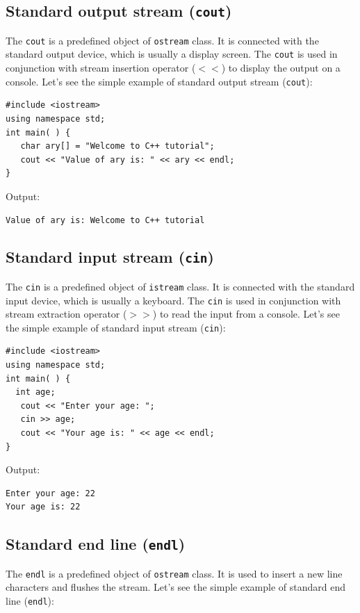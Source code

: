 \documentclass{book}
\begin{document}
\subsection{Standard output stream (\texttt{cout})}

The \texttt{cout} is a predefined object of \texttt{ostream} class. It is connected with the standard output device, which is usually a display screen. The \texttt{cout} is used in conjunction with stream insertion operator ($<<$) to display the output on a console. Let's see the simple example of standard output stream (\texttt{cout}):

\begin{verbatim}
#include <iostream>  
using namespace std;  
int main( ) {  
   char ary[] = "Welcome to C++ tutorial";  
   cout << "Value of ary is: " << ary << endl;  
}  
\end{verbatim}

Output:
\begin{verbatim}
Value of ary is: Welcome to C++ tutorial
\end{verbatim}

\subsection{Standard input stream (\texttt{cin})}

The \texttt{cin} is a predefined object of \texttt{istream} class. It is connected with the standard input device, which is usually a keyboard. The \texttt{cin} is used in conjunction with stream extraction operator ($>>$) to read the input from a console. Let's see the simple example of standard input stream (\texttt{cin}):

\begin{verbatim}
#include <iostream>  
using namespace std;  
int main( ) {  
  int age;  
   cout << "Enter your age: ";  
   cin >> age;  
   cout << "Your age is: " << age << endl;  
}  
\end{verbatim} 

Output:
\begin{verbatim}
Enter your age: 22
Your age is: 22
\end{verbatim}

\subsection{Standard end line (\texttt{endl})}

The \texttt{endl} is a predefined object of \texttt{ostream} class. It is used to insert a new line characters and flushes the stream. Let's see the simple example of standard end line (\texttt{endl}):
\end{document}
